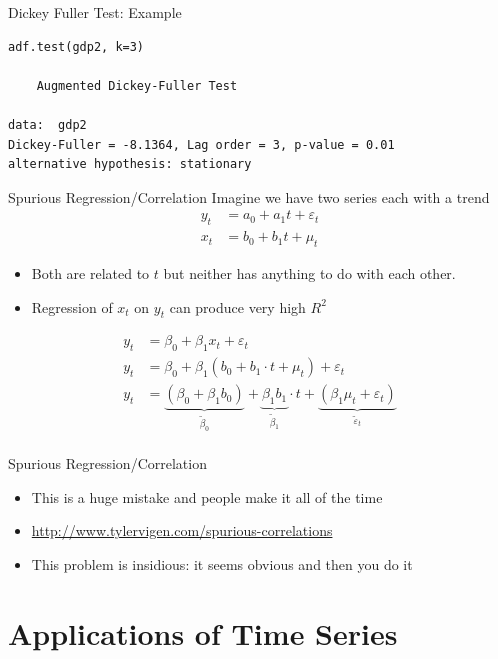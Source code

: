 \documentclass[aspectratio=169]{beamer}
\begin{document}
\begin{frame}[fragile]{Dickey Fuller Test: Example}
\small
\begin{verbatim}
adf.test(gdp2, k=3)

    Augmented Dickey-Fuller Test

data:  gdp2
Dickey-Fuller = -8.1364, Lag order = 3, p-value = 0.01
alternative hypothesis: stationary
\end{verbatim}
\end{frame}


\begin{frame}{Spurious Regression/Correlation}
Imagine we have two series each with a trend
\begin{align*}
y_{t} &= a_0 + a_1 t + \varepsilon_{t}\\
x_{t} &= b_0 + b_1 t + \mu_{t}
\end{align*}
\begin{itemize}
    \item Both are related to $t$ but neither has anything to do with each other.
    \item Regression of $x_t$ on $y_t$ can produce very high $R^2$
\end{itemize}
\begin{align*}
y_{t} &= \beta_0  + \beta_1 x_{t} + \varepsilon_t\\
y_{t} &= \beta_0  + \beta_1 (b_0 + b_1 \cdot t + \mu_t) + \varepsilon_t\\
y_{t} &= \underbrace{(\beta_0  + \beta_1 b_0)}_{\widetilde{\beta}_0}  + \underbrace{\beta_1 b_1}_{\widetilde{\beta}_1} \cdot t + \underbrace{(\beta_1 \mu_t+ \varepsilon_t)}_{\widetilde{\varepsilon}_t}\\
\end{align*}
\end{frame}

\begin{frame}{Spurious Regression/Correlation}
\begin{itemize}
\item This is a \alert{huge mistake} and people make it all of the time
\item \url{http://www.tylervigen.com/spurious-correlations}
\item This problem is insidious: it seems obvious and then you do it
\end{itemize}
\end{frame}


\section{Applications of Time Series}
\end{document}
